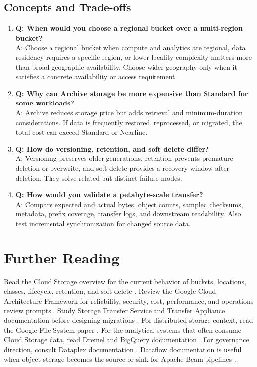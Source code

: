 \subsection{Concepts and Trade-offs}
\begin{enumerate}
    \item \textbf{Q: When would you choose a regional bucket over a multi-region bucket?}\\
    A: Choose a regional bucket when compute and analytics are regional, data residency requires a specific region, or lower locality complexity matters more than broad geographic availability. Choose wider geography only when it satisfies a concrete availability or access requirement.

    \item \textbf{Q: Why can Archive storage be more expensive than Standard for some workloads?}\\
    A: Archive reduces storage price but adds retrieval and minimum-duration considerations. If data is frequently restored, reprocessed, or migrated, the total cost can exceed Standard or Nearline.

    \item \textbf{Q: How do versioning, retention, and soft delete differ?}\\
    A: Versioning preserves older generations, retention prevents premature deletion or overwrite, and soft delete provides a recovery window after deletion. They solve related but distinct failure modes.

    \item \textbf{Q: How would you validate a petabyte-scale transfer?}\\
    A: Compare expected and actual bytes, object counts, sampled checksums, metadata, prefix coverage, transfer logs, and downstream readability. Also test incremental synchronization for changed source data.
\end{enumerate}

\section{Further Reading}
Read the Cloud Storage overview for the current behavior of buckets, locations, classes, lifecycle, retention, and soft delete \cite{googlecloudstorageoverview}. Review the Google Cloud Architecture Framework for reliability, security, cost, performance, and operations review prompts \cite{googlecloudarchitectureframework}. Study Storage Transfer Service and Transfer Appliance documentation before designing migrations \cite{googlecloudstoragetransfer,googlecloudtransferappliance}. For distributed-storage context, read the Google File System paper \cite{ghemawat2003gfs}. For the analytical systems that often consume Cloud Storage data, read Dremel and BigQuery documentation \cite{melnik2010dremel,googlecloudbigquerydocs}. For governance direction, consult Dataplex documentation \cite{googleclouddataplexdocs}. Dataflow documentation is useful when object storage becomes the source or sink for Apache Beam pipelines \cite{googleclouddataflowdocs}.

